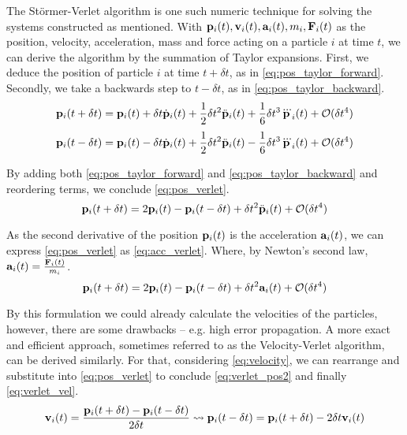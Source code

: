 The Störmer-Verlet algorithm is one such numeric technique for solving the systems constructed as mentioned.
With $\mathbf{p}_i(t), \mathbf{v}_i(t), \mathbf{a}_i(t), m_i, \mathbf{F}_i(t)$ as the position, velocity, acceleration, mass and force acting on a particle $i$ at time $t$, we can derive the algorithm by the summation of Taylor expansions. First, we deduce the position of particle $i$ at time $t+\delta t$, as in \eqref{eq:pos_taylor_forward}. Secondly, we take a backwards step to $t-\delta t$, as in \eqref{eq:pos_taylor_backward}.
\begin{equation}
	\mathbf{p}_i(t+\delta t) = \mathbf{p}_i(t)+\delta t\dot{\mathbf{p}}_i(t)+\frac{1}{2}\delta t^2\ddot{\mathbf{p}}_i(t)+\frac{1}{6}\delta t^3\dddot{\mathbf{p}}_i(t)+\mathcal{O}(\delta t^4)\label{eq:pos_taylor_forward}
\end{equation}
\begin{equation}
	\mathbf{p}_i(t-\delta t) = \mathbf{p}_i(t)-\delta t\dot{\mathbf{p}}_i(t)+\frac{1}{2}\delta t^2\ddot{\mathbf{p}}_i(t)-\frac{1}{6}\delta t^3\dddot{\mathbf{p}}_i(t)+\mathcal{O}(\delta t^4)\label{eq:pos_taylor_backward}
\end{equation}

By adding both \eqref{eq:pos_taylor_forward} and \eqref{eq:pos_taylor_backward} and reordering terms, we conclude \eqref{eq:pos_verlet}.
\begin{equation}
\mathbf{p}_i(t+\delta t) = 2\mathbf{p}_i(t) - \mathbf{p}_i(t-\delta t) + \delta t^2\ddot{\mathbf{p}}_i(t) + \mathcal{O}(\delta t^4)\label{eq:pos_verlet}
\end{equation}

As the second derivative of the position $\mathbf{p}_i(t)$ is the acceleration $\mathbf{a}_i(t)$, we can express \eqref{eq:pos_verlet} as \eqref{eq:acc_verlet}. Where, by Newton's second law, $\mathbf{a}_i(t) = \frac{\mathbf{F}_i(t)}{m_i}$.
\begin{equation}
	\mathbf{p}_i(t+\delta t) = 2\mathbf{p}_i(t) - \mathbf{p}_i(t-\delta t) + \delta t^2{\mathbf{a}}_i(t) + \mathcal{O}(\delta t^4)\label{eq:acc_verlet}
\end{equation}

By this formulation we could already calculate the velocities of the particles, however, there are some drawbacks -- e.g. high error propagation. A more exact and efficient approach, sometimes referred to as the Velocity-Verlet algorithm, can be derived similarly.
For that, considering \eqref{eq:velocity}, we can rearrange and substitute into \eqref{eq:pos_verlet} to conclude \eqref{eq:verlet_pos2} and finally \eqref{eq:verlet_vel}.
\begin{equation}
	\mathbf{v}_i(t) = \frac{\mathbf{p}_i(t+\delta t) -\mathbf{p}_i(t-\delta t)}{2\delta t} \rightsquigarrow \mathbf{p}_i(t-\delta t)= \mathbf{p}_i(t+\delta t)-2\delta t \mathbf{v}_i(t) \label{eq:velocity}
\end{equation}

